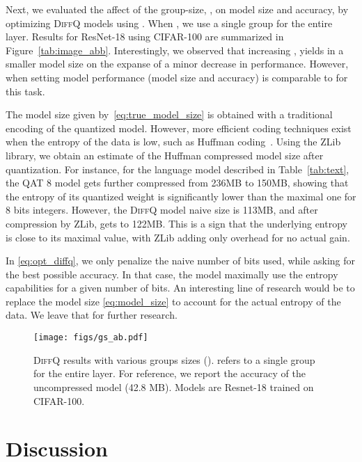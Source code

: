 \documentclass{article}
\newcommand{\diffq}{\textsc{DiffQ}\xspace}
\begin{document}
Next, we evaluated the affect of the group-size, , on model size and accuracy, by optimizing \diffq models using . When , we use a single group for the entire layer. Results for ResNet-18 using CIFAR-100 are summarized in Figure~\ref{tab:image_abb}. Interestingly, we observed that increasing , yields in a smaller model size on the expanse of a minor decrease in performance. However, when setting  model performance (model size and accuracy) is comparable to  for this task.

\noindent{\bf {\diffq maximizes entropy usage}}
The model size given by~\eqref{eq:true_model_size} is obtained with a traditional encoding of the quantized model.
However, more efficient coding techniques exist when the entropy of the data is low, such as Huffman coding~\citep{huffman}. Using the ZLib library, we obtain an estimate of the Huffman compressed model size after quantization. For instance, for the language model described in Table~\ref{tab:text}, the QAT 8 model gets further compressed from 236MB to 150MB, showing that the entropy of its quantized weight is significantly lower than the maximal one for 8 bits integers. However, the \diffq model naive size is 113MB, and after compression by ZLib, gets to 122MB.
This is a sign that the underlying entropy is close to its maximal value, with ZLib adding only overhead for no actual gain.

In \eqref{eq:opt_diffq}, we only penalize the naive number of bits used, while asking for
the best possible accuracy. In that case, the model maximally use the entropy capabilities for a given number of bits. An interesting line of research would be to replace the model size \eqref{eq:model_size} to account for the actual entropy of the data. We leave that for further research.




 
\begin{figure}[t!]
\vskip 0.2in
\begin{center}
\centerline{\texttt{[image: figs/gs\_ab.pdf]}}
\caption{\diffq results with various groups sizes ().  refers to a single group for the entire layer. For reference, we report the accuracy of the uncompressed model (42.8 MB). 
Models are Resnet-18 trained on CIFAR-100.}
\label{fig:gs}
\end{center}
\vskip -0.35in
\end{figure}

\vspace{-0.1cm}
\section{Discussion}
\vspace{-0.1cm}
\label{discussion}
\end{document}
